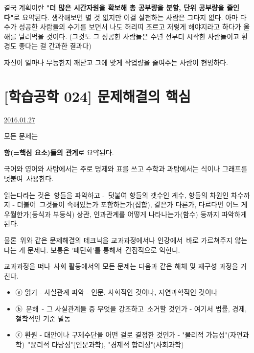 결국 계획이란 \textbf{"더 많은 시간자원을 확보해 총 공부량을 분할, 단위 공부량을 줄인다"}로 요약된다.
생각해보면 별 것 없지만 이걸 실천하는 사람은 그다지 없다.
아마 다수가 성공한 사람들의 수기를 보면서 나도 허리띠 조르고 저렇게 해야지라고 하다가 올해를 날려먹을 것이다.
(그것도 그 성공한 사람들은 수년 전부터 시작한 사람들이고 환경도 좋다는 걸 간과한 결과다)
\vspace{5mm}

자신이 얼마나 무능한지 깨닫고 그에 맞게 작업량을 줄여주는 사람이 현명하다.
\vspace{5mm}






\section{[학습공학 024] 문제해결의 핵심}
\href{https://www.kockoc.com/Apoc/611483}{2016.01.27}

\vspace{5mm}

모든 문제는
\vspace{5mm}

\textbf{항(=핵심 요소)들의 관계}로 요약된다.
\vspace{5mm}

국어와 영어와 사탐에서는 주로 명제와 표를 쓰고
수학과 과탐에서는 식이나 그래프를 덧붙여 사용한다.
\vspace{5mm}

읽는다라는 것은 항들을 파악하고 - 덧붙여 항들의 갯수인 계수, 항들의 차원인 차수까지 -
더불어 그것들이 속해있는가 포함하는가(집합), 같은가 다른가, 다르다면 어느 게 우월한가(등식과 부등식)
상관, 인과관계를 어떻게 나타나는가(함수) 등까지 파악하게 된다.
\vspace{5mm}

물론 위와 같은 문제해결의 테크닉을 교과과정에서나 인강에서 바로 가르쳐주지 않는다는 게 문제다.
보통은 '패턴화'를 통해서 간접적으로 익힌디.
\vspace{5mm}

교과과정을 떠나 사회 활동에서의 모든 문제는 다음과 같은 해체 및 재구성 과정을 거친다.
\vspace{5mm}

\begin{itemize}
    \item ⓐ 읽기 - 사실관계 파악 - 인문, 사회적인 것이냐, 자연과학적인 것이냐
    \item ⓑ 분해 - 그 사실관계들 중 무엇을 강조하고 소거할 것인가 - 여기서 법률, 경제, 철학적인 기준 발동
    \item ⓒ 환원 - 대안이나 구제수단을 어떤 걸로 결정한 것인가 - "물리적 가능성"(자연과학) "윤리적 타당성"(인문과학), "경제적 합리성"(사회과학)
\end{itemize}
\vspace{5mm}

